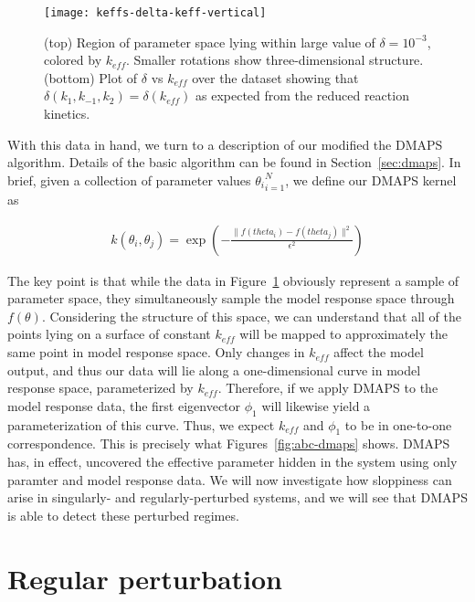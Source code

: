 \begin{figure}[ht!]
  \centering
  \texttt{[image: keffs-delta-keff-vertical]}
  \caption[Quantitative three-dimensional views of level sets of the
  effective parameter in a model of chemical kinetics]{(top) Region of
    parameter space lying within large value of $\delta = 10^{-3}$,
    colored by $k_{eff}$. Smaller rotations show three-dimensional
    structure. (bottom) Plot of $\delta$ vs $k_{eff}$ over the dataset
    showing that $\delta(k_1, k_{-1}, k_2) = \delta(k_{eff})$ as
    expected from the reduced reaction kinetics. \label{fig:abc-keff}
  }
\end{figure}

With this data in hand, we turn to a description of our modified the
DMAPS algorithm. Details of the basic algorithm can be found in
Section~\ref{sec:dmaps}. In brief, given a collection of parameter
values ${\theta_i}_{i=1}^N$, we define our DMAPS kernel as

\begin{align}
  k(\theta_i, \theta_j) = \exp \left(-\frac{\|f(theta_i) -
  f(theta_j)\|^2}{\epsilon^2} \right)
  \label{eq:dmaps-mm}
\end{align}

The key point is that while the data in Figure~\ref{fig:abc-keff}
obviously represent a sample of parameter space, they simultaneously
sample the model response space through $f(\theta)$. Considering the
structure of this space, we can understand that all of the points
lying on a surface of constant $k_{eff}$ will be mapped to
approximately the same point in model response space. Only changes in
$k_{eff}$ affect the model output, and thus our data will lie along a
one-dimensional curve in model response space, parameterized by
$k_{eff}$. Therefore, if we apply DMAPS to the model response data,
the first eigenvector $\phi_1$ will likewise yield a parameterization
of this curve. Thus, we expect $k_{eff}$ and $\phi_1$ to be in
one-to-one correspondence. This is precisely what
Figures~\ref{fig:abc-dmaps} shows. DMAPS has, in effect, uncovered the
effective parameter hidden in the system using only paramter and model
response data. We will now investigate how sloppiness can arise in
singularly- and regularly-perturbed systems, and we will see that
DMAPS is able to detect these perturbed regimes.


\section{Regular perturbation}

